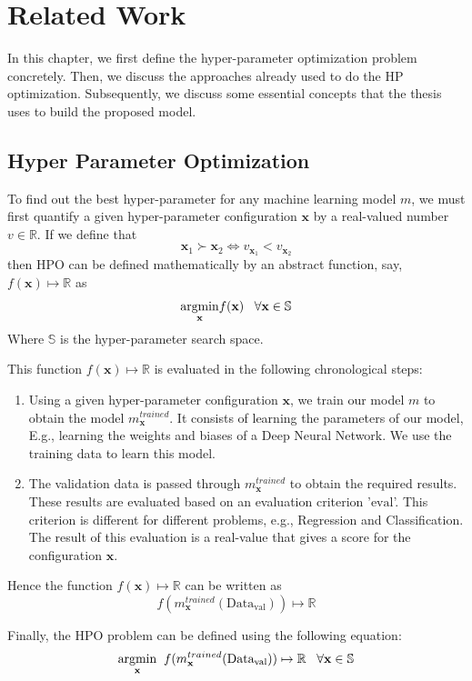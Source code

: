 \documentclass[12pt, twoside, ngerman]{report}
\begin{document}
\chapter{Related Work}\label{chap:relatedWork}

In this chapter,  we first define the hyper-parameter optimization problem concretely.
Then, we discuss the approaches already used to do the HP optimization.
Subsequently, we discuss some essential concepts that the thesis uses to build the proposed model.

\section{Hyper Parameter Optimization}
To find out the best hyper-parameter for any machine learning model $m$, we must first quantify a given hyper-parameter configuration $\textbf{x}$ by a real-valued number $v \in \mathbb{R}$.
If we define that
$$
\textbf{x}_1 \succ  \textbf{x}_2 \iff v_{\textbf{x}_1} < v_{\textbf{x}_2}
$$
then HPO can be defined mathematically by an abstract function, say,  $f(\textbf{x}) \mapsto \mathbb{R}$ as
$$
     \underset{\rm \textbf{x}}{\rm argmin}  f(\textbf{x}) \;\;\;  \forall \textbf{x} \in \mathbb{S}
$$
Where $\mathbb{S}$ is the hyper-parameter search space.

This function $f(\textbf{x}) \mapsto \mathbb{R}$ is evaluated in the following chronological steps:
\begin{enumerate}
\item Using a given hyper-parameter configuration $\textbf{x}$,  we train our model $m$ to obtain the model $m^{trained}_\textbf{x}$. It consists of learning the parameters of our model, E.g., learning the weights and biases of a Deep Neural Network.
We use the training data to learn this model.
\item The validation data is passed through $m^{trained}_\textbf{x}$ to obtain the required results.
These results are evaluated based on an evaluation criterion '$\textrm{eval}$'. This criterion is different for different problems, e.g., Regression and Classification.
The result of this evaluation is a real-value that gives a score for the configuration $\textbf{x}$.
\end{enumerate}

Hence the function $f(\textbf{x}) \mapsto \mathbb{R}$ can be written as 
$$
f(m^{trained}_\textbf{x} (\textrm{Data}_\textrm{val})) \mapsto \mathbb{R}
$$

Finally, the HPO problem can be defined using the following equation:
\begin{equation}\label{eq:hpoobjectivefunc}
\underset{\rm \textbf{x}}{\rm argmin} \;\; f(m^{trained}_\textbf{x} (\textrm{Data}_\textrm{val})) \mapsto \mathbb{R}   \;\;\;  \forall \textbf{x} \in \mathbb{S}
\end{equation}
\end{document}
